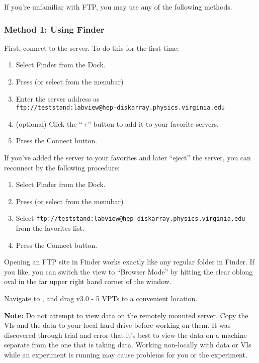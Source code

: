 If you're unfamiliar with FTP, you may use any of the following methods.

\subsubsection{Method 1: Using Finder}
\label{sec:op_start:vptvi:finder}

First, connect to the server.  To do this for the first time:
\begin{enumerate}
\item Select \textsf{Finder} from the Dock.
\item Press  (or select  from the menubar)
\item Enter the server address as \\
  \texttt{ftp://teststand:labview@hep-diskarray.physics.virginia.edu}
\item (optional) Click the ``+'' button to add it to your favorite servers.
\item Press the \textsf{Connect} button.
\end{enumerate}

If you've added the server to your favorites and later ``eject'' the server, you can reconnect by the following procedure:
\begin{enumerate}
\item Select \textsf{Finder} from the Dock.
\item Press  (or select  from the menubar)
\item Select \texttt{ftp://teststand:labview@hep-diskarray.physics.virginia.edu} from the favorites list.
\item Press the \textsf{Connect} button.
\end{enumerate}

Opening an FTP site in Finder works exactly like any regular folder in Finder.  If you like, you can switch the view to ``Browser Mode'' by hitting the clear oblong oval in the far upper right hand corner of the window.

Navigate to , and drag \textsf{v3.0 - 5 VPTs} to a convenient location.

\textbf{Note:} Do not attempt to view data on the remotely mounted server.  Copy the VIs and the data to your local hard drive before working on them.  It was discovered through trial and error that it's best to view the data on a machine separate from the one that is taking data.  Working non-locally with data or VIs while an experiment is running may cause problems for you or the experiment.

